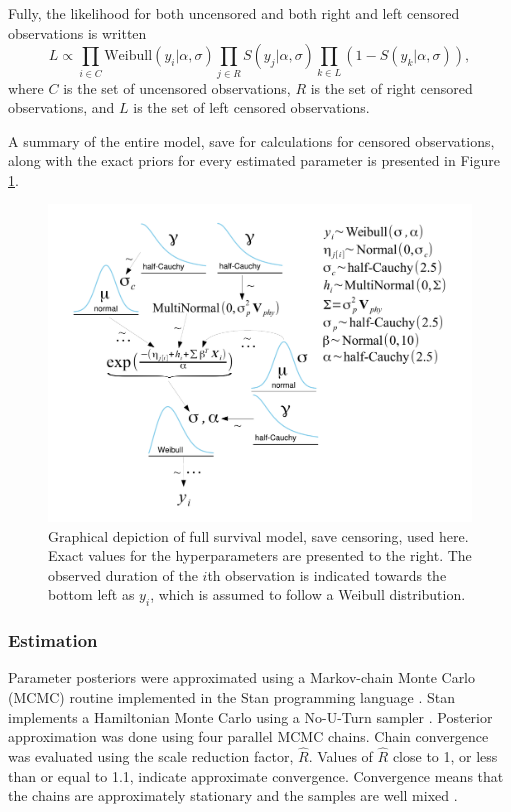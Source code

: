 \documentclass[12pt,letterpaper]{article}
\begin{document}
Fully, the likelihood for both uncensored and both right and left censored observations is written
\begin{equation*}
  L \propto \prod_{i \in C} \mathrm{Weibull}(y_{i} | \alpha, \sigma) \prod_{j \in R} S(y_j | \alpha, \sigma) \prod_{k \in L} \left(1 - S(y_{k} | \alpha, \sigma)\right),
\end{equation*}
where \(C\) is the set of uncensored observations, \(R\) is the set of right censored observations, and \(L\) is the set of left censored observations.

A summary of the entire model, save for calculations for censored observations, along with the exact priors for every estimated parameter is presented in Figure \ref{fig:model_diagram}.

\begin{figure}
  \centering
  \includegraphics[height = 0.5\textheight, width = \textwidth, keepaspectratio = true]{figure/mammal_survival_model}
  \caption{Graphical depiction of full survival model, save censoring, used here. Exact values for the hyperparameters are presented to the right. The observed duration of the \(i\)th observation is indicated towards the bottom left as \(y_{i}\), which is assumed to follow a Weibull distribution.}
  \label{fig:model_diagram}
\end{figure}


\subsubsection{Estimation}
Parameter posteriors were approximated using a Markov-chain Monte Carlo (MCMC) routine implemented in the Stan programming language \citep{2014stan}. Stan implements a Hamiltonian Monte Carlo using a No-U-Turn sampler \citep{Hoffman-Gelman:2011}. Posterior approximation was done using four parallel MCMC chains. Chain convergence was evaluated using the scale reduction factor, \(\hat{R}\). Values of \(\hat{R}\) close to 1, or less than or equal to 1.1, indicate approximate convergence. Convergence means that the chains are approximately stationary and the samples are well mixed \citep{Gelman2013d}.
\end{document}

